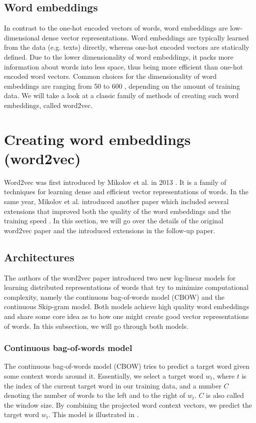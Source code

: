\subsection{Word embeddings}
In contrast to the one-hot encoded vectors of words, word embeddings are low-dimensional dense vector representations. Word embeddings are typically learned from the data (e.g. texts) directly, whereas one-hot encoded vectors are statically defined. Due to the lower dimensionality of word embeddings, it packs more information about words into less space, thus being more efficient than one-hot encoded word vectors. Common choices for the dimensionality of word embeddings are ranging from 50 to 600 \cite{mikolov2013a}, depending on the amount of training data. We will take a look at a classic family of methods of creating such word embeddings, called word2vec.

\section{Creating word embeddings (word2vec)}
Word2vec was first introduced by Mikolov et al. in 2013 \cite{mikolov2013a}. It is a family of techniques for learning dense and efficient vector representations of words. In the same year, Mikolov et al. introduced another paper which included several extensions that improved both the quality of the word embeddings and the training speed \cite{mikolov2013b}. In this section, we will go over the details of the original word2vec paper and the introduced extensions in the follow-up paper.

\subsection{Architectures}
The authors of the word2vec paper introduced two new log-linear models for learning distributed representations of words that try to minimize computational complexity, namely the continuous bag-of-words model (CBOW) and the continuous Skip-gram model. Both models achieve high quality word embeddings \cite{mikolov2013a} and share some core idea as to how one might create good vector representations of words. In this subsection, we will go through both models.

\subsubsection{Continuous bag-of-words model}
The continuous bag-of-words model (CBOW) tries to predict a target word given some context words around it. Essentially, we select a target word $w_t$, where $t$ is the index of the current target word in our training data, and a number $C$ denoting the number of words to the left and to the right of $w_t$. $C$ is also called the window size. By combining the projected word context vectors, we predict the target word $w_t$. This model is illustrated in .

